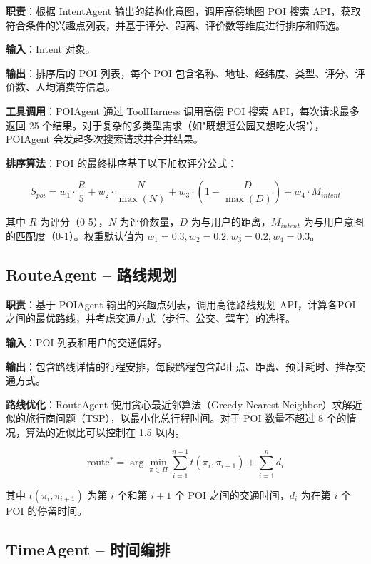 \documentclass[12pt,a4paper]{ctexart}
\begin{document}
\textbf{职责}：根据 IntentAgent 输出的结构化意图，调用高德地图 POI 搜索 API，获取符合条件的兴趣点列表，并基于评分、距离、评价数等维度进行排序和筛选。

\textbf{输入}：Intent 对象。

\textbf{输出}：排序后的 POI 列表，每个 POI 包含名称、地址、经纬度、类型、评分、评价数、人均消费等信息。

\textbf{工具调用}：POIAgent 通过 ToolHarness 调用高德 POI 搜索 API，每次请求最多返回 25 个结果。对于复杂的多类型需求（如"既想逛公园又想吃火锅"），POIAgent 会发起多次搜索请求并合并结果。

\textbf{排序算法}：POI 的最终排序基于以下加权评分公式：

\begin{equation}
S_{poi} = w_1 \cdot \frac{R}{5} + w_2 \cdot \frac{N}{\max(N)} + w_3 \cdot (1 - \frac{D}{\max(D)}) + w_4 \cdot M_{intent}
\end{equation}

其中 $R$ 为评分（0-5），$N$ 为评价数量，$D$ 为与用户的距离，$M_{intent}$ 为与用户意图的匹配度（0-1）。权重默认值为 $w_1=0.3, w_2=0.2, w_3=0.2, w_4=0.3$。

\subsection{RouteAgent -- 路线规划}

\textbf{职责}：基于 POIAgent 输出的兴趣点列表，调用高德路线规划 API，计算各POI之间的最优路线，并考虑交通方式（步行、公交、驾车）的选择。

\textbf{输入}：POI 列表和用户的交通偏好。

\textbf{输出}：包含路线详情的行程安排，每段路程包含起止点、距离、预计耗时、推荐交通方式。

\textbf{路线优化}：RouteAgent 使用贪心最近邻算法（Greedy Nearest Neighbor）求解近似的旅行商问题（TSP），以最小化总行程时间。对于 POI 数量不超过 8 个的情况，算法的近似比可以控制在 1.5 以内。

\begin{equation}
\text{route}^* = \arg\min_{\pi \in \Pi} \sum_{i=1}^{n-1} t(\pi_i, \pi_{i+1}) + \sum_{i=1}^{n} d_i
\end{equation}

其中 $t(\pi_i, \pi_{i+1})$ 为第 $i$ 个和第 $i+1$ 个 POI 之间的交通时间，$d_i$ 为在第 $i$ 个 POI 的停留时间。

\subsection{TimeAgent -- 时间编排}
\end{document}
